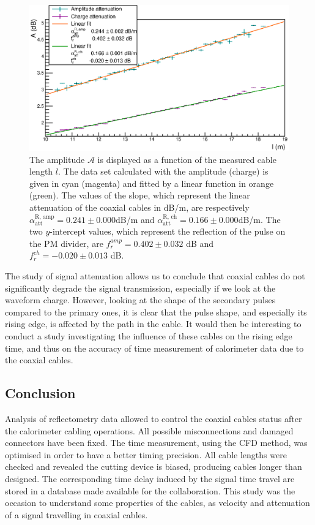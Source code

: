 \begin{figure}[h!]
  \centering
  \includegraphics[width=15cm]{commissioning/fig_commissioning/attenuation_length.eps}
  \caption{The amplitude $\mathcal{A}$ is displayed as a function of the measured cable length $l$.
    The data set calculated with the amplitude (charge) is given in cyan (magenta) and fitted by a linear function in orange (green).
    The values of the slope, which represent the linear attenuation of the coaxial cables in dB/m, are respectively $\alpha_{\text{att}}^{\text{R, amp}} = 0.241\pm 0.000$dB/m and $\alpha_{\text{att}}^{\text{R, ch}} = 0.166\pm0.000$dB/m.
    The two $y$-intercept values, which represent the reflection of the pulse on the PM divider, are $f_{r}^{amp} = 0.402\pm 0.032$ dB and $f_{r}^{ch} = -0.020\pm 0.013$ dB.
    \label{fig:attenuation}}
\end{figure}

The study of signal attenuation allows us to conclude that coaxial cables do not significantly degrade the signal transmission, especially if we look at the waveform charge.
However, looking at the shape of the secondary pulses compared to the primary ones, it is clear that the pulse shape, and especially its rising edge, is affected by the path in the cable.
It would then be interesting to conduct a study investigating the influence of these cables on the rising edge time, and thus on the accuracy of time measurement of calorimeter data due to the coaxial cables.

\subsection{Conclusion}

Analysis of reflectometry data allowed to control the coaxial cables status after the calorimeter cabling operations.
All possible misconnections and damaged connectors have been fixed.
The time measurement, using the CFD method, was optimised in order to have a better timing precision.
All cable lengths were checked and revealed the cutting device is biased, producing cables longer than designed.
The corresponding time delay induced by the signal time travel are stored in a database made available for the collaboration.
This study was the occasion to understand some properties of the cables, as velocity and attenuation of a signal travelling in coaxial cables.


